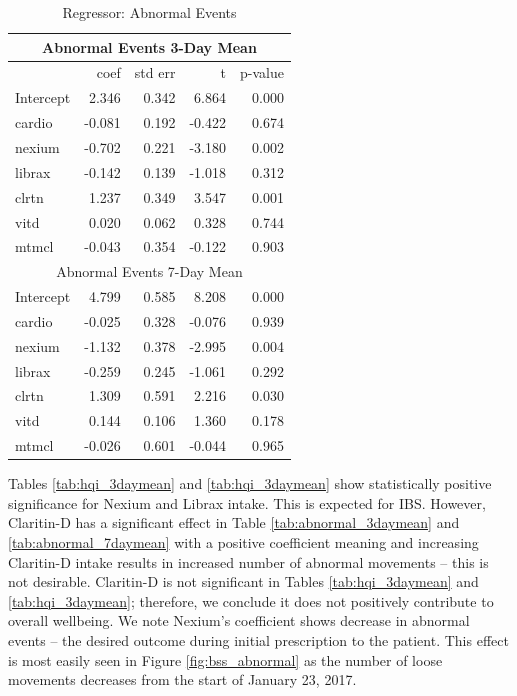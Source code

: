 \documentclass[conference]{IEEEtran}
\begin{document}
\begin{table}
\begin{center}
\caption{Regressor: Abnormal Events} \label{tab:abnormal_events}
    \begin{tabular}{ | l | r | r | r | r |}
    \hline
    \multicolumn{5}{|c|}{Abnormal Events 3-Day Mean} \\
    \hline    
     & coef & std err & t & p-value \\ \hline
Intercept & 2.346 & 0.342 & 6.864 & 0.000 \\
cardio & -0.081 & 0.192 & -0.422 & 0.674 \\
nexium & -0.702 & 0.221 & -3.180 & 0.002 \\
librax & -0.142 & 0.139 & -1.018 & 0.312 \\
clrtn & 1.237 & 0.349 & 3.547 & 0.001 \\
vitd & 0.020 & 0.062 & 0.328 & 0.744 \\
mtmcl & -0.043 & 0.354 & -0.122 & 0.903 \\       
    \hline    
    \multicolumn{5}{|c|}{Abnormal Events 7-Day Mean} \\
    \hline
Intercept & 4.799 & 0.585 & 8.208 & 0.000 \\
cardio & -0.025 & 0.328 & -0.076 & 0.939 \\
nexium & -1.132 & 0.378 & -2.995 & 0.004 \\
librax & -0.259 & 0.245 & -1.061 & 0.292 \\
clrtn & 1.309 & 0.591 & 2.216 & 0.030 \\
vitd & 0.144 & 0.106 & 1.360 & 0.178 \\
mtmcl & -0.026 & 0.601 & -0.044 & 0.965 \\
    \hline
    \end{tabular}
\end{center}
\end{table}

Tables \ref{tab:hqi_3daymean} and \ref{tab:hqi_3daymean} show statistically positive significance for Nexium and Librax intake.  This is expected for IBS.  However, Claritin-D has a significant effect in Table \ref{tab:abnormal_3daymean} and \ref{tab:abnormal_7daymean} with a positive coefficient  meaning and increasing Claritin-D intake results in increased number of abnormal movements -- this is not desirable. Claritin-D is not significant in Tables \ref{tab:hqi_3daymean} and \ref{tab:hqi_3daymean}; therefore, we conclude it does not positively contribute to overall wellbeing.  We note Nexium's coefficient shows decrease in abnormal events -- the desired outcome during initial prescription to the patient.  This effect is most easily seen in Figure \ref{fig:bss_abnormal} as the number of loose movements decreases from the start of January 23, 2017.
\end{document}

